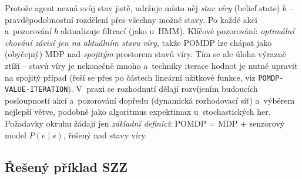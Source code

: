 \begin{intuice}
Protože agent nezná svůj stav jistě, udržuje místo něj \emph{stav víry} (belief state) $b$ -- pravděpodobnostní rozdělení přes všechny možné stavy. Po každé akci a~pozorování $b$ aktualizuje filtrací (jako u~HMM). Klíčové pozorování: \emph{optimální chování závisí jen na aktuálním stavu víry}, takže POMDP lze chápat jako (obyčejný) MDP nad \emph{spojitým} prostorem stavů víry. Tím se ale úloha výrazně ztíží -- stavů víry je nekonečně mnoho a~techniky iterace hodnot je nutné upravit na spojitý případ (řeší se přes po částech lineární užitkové funkce, viz \texttt{POMDP-VALUE-ITERATION}). V~praxi se rozhodnutí dělají rozvíjením budoucích posloupností akcí a~pozorování dopředu (dynamická rozhodovací síť) a~výběrem nejlepší větve, podobně jako algoritmus expektimax u~stochastických her. Požadavky okruhu žádají jen \emph{základní definici}: POMDP = MDP + senzorový model $P(e\mid s)$, řešený nad stavy víry.
\end{intuice}

\subsection{Řešený příklad SZZ}

